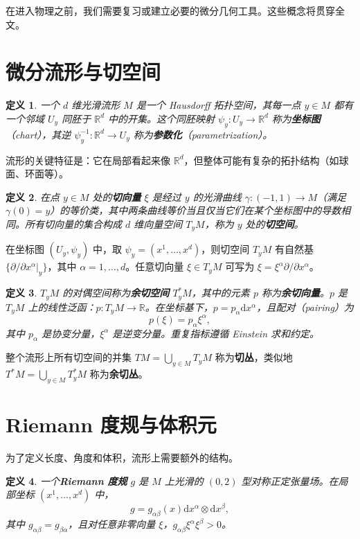 \documentclass{book}
\newcommand{\mathd}{\mathrm{d}}
\newtheorem{definition}{定义}[chapter]
\begin{document}
在进入物理之前，我们需要复习或建立必要的微分几何工具。这些概念将贯穿全文。

\section{微分流形与切空间}

\begin{definition}
  一个 $d$ 维光滑流形 $M$ 是一个 Hausdorff 拓扑空间，其每一点 $y \in M$ 都有一个邻域 $U_y$ 同胚于 $\mathbb{R}^d$ 中的开集。这个同胚映射 $\psi_y: U_y \to \mathbb{R}^d$ 称为\textbf{坐标图}（chart），其逆 $\psi_y^{-1}: \mathbb{R}^d \to U_y$ 称为\textbf{参数化}（parametrization）。
\end{definition}

流形的关键特征是：它在局部看起来像 $\mathbb{R}^d$，但整体可能有复杂的拓扑结构（如球面、环面等）。

\begin{definition}
  在点 $y \in M$ 处的\textbf{切向量} $\xi$ 是经过 $y$ 的光滑曲线 $\gamma: (-1,1) \to M$（满足 $\gamma(0)=y$）的等价类，其中两条曲线等价当且仅当它们在某个坐标图中的导数相同。所有切向量的集合构成 $d$ 维向量空间 $T_yM$，称为 $y$ 处的\textbf{切空间}。
\end{definition}

在坐标图 $(U_y, \psi_y)$ 中，取 $\psi_y = (x^1, \ldots, x^d)$，则切空间 $T_yM$ 有自然基 $\{ \partial/\partial x^\alpha |_y \}$，其中 $\alpha=1,\ldots,d$。任意切向量 $\xi \in T_yM$ 可写为 $\xi = \xi^\alpha \partial/\partial x^\alpha$。

\begin{definition}
  $T_yM$ 的对偶空间称为\textbf{余切空间} $T_y^*M$，其中的元素 $p$ 称为\textbf{余切向量}。$p$ 是 $T_yM$ 上的线性泛函：$p: T_yM \to \mathbb{R}$。在坐标基下，$p = p_\alpha \mathd x^\alpha$，且配对（pairing）为
  \[
  p(\xi) = p_\alpha \xi^\alpha,
  \]
  其中 $p_\alpha$ 是协变分量，$\xi^\alpha$ 是逆变分量。重复指标遵循 Einstein 求和约定。
\end{definition}

整个流形上所有切空间的并集 $TM = \bigcup_{y\in M} T_yM$ 称为\textbf{切丛}，类似地 $T^*M = \bigcup_{y\in M} T_y^*M$ 称为\textbf{余切丛}。

\section{Riemann 度规与体积元}

为了定义长度、角度和体积，流形上需要额外的结构。

\begin{definition}
  一个\textbf{Riemann 度规} $g$ 是 $M$ 上光滑的 $(0,2)$ 型对称正定张量场。在局部坐标 $(x^1,\ldots,x^d)$ 中，
  \[
  g = g_{\alpha\beta}(x) \mathd x^\alpha \otimes \mathd x^\beta,
  \]
  其中 $g_{\alpha\beta} = g_{\beta\alpha}$，且对任意非零向量 $\xi$，$g_{\alpha\beta} \xi^\alpha \xi^\beta > 0$。
\end{definition}
\end{document}
